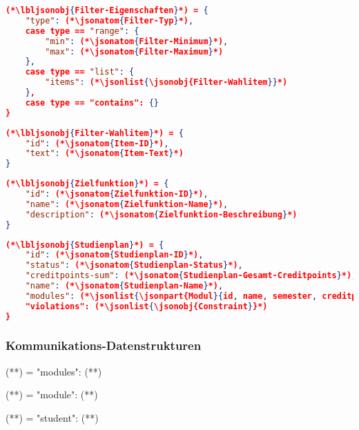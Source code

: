 \begin{lstlisting}[language=json]
(*\lbljsonobj{Filter-Eigenschaften}*) = {
	"type": (*\jsonatom{Filter-Typ}*),
	case type == "range": {
		"min": (*\jsonatom{Filter-Minimum}*),
		"max": (*\jsonatom{Filter-Maximum}*)
	},
	case type == "list": {
		"items": (*\jsonlist{\jsonobj{Filter-Wahlitem}}*)
	},
	case type == "contains": {}
}
\end{lstlisting}

\begin{lstlisting}[language=json]
(*\lbljsonobj{Filter-Wahlitem}*) = {
	"id": (*\jsonatom{Item-ID}*),
	"text": (*\jsonatom{Item-Text}*)
}
\end{lstlisting}

\begin{lstlisting}[language=json]
(*\lbljsonobj{Zielfunktion}*) = {
	"id": (*\jsonatom{Zielfunktion-ID}*),
	"name": (*\jsonatom{Zielfunktion-Name}*),
	"description": (*\jsonatom{Zielfunktion-Beschreibung}*)
}
\end{lstlisting}

\begin{lstlisting}[language=json]
(*\lbljsonobj{Studienplan}*) = {
    "id": (*\jsonatom{Studienplan-ID}*),
    "status": (*\jsonatom{Studienplan-Status}*),
    "creditpoints-sum": (*\jsonatom{Studienplan-Gesamt-Creditpoints}*),
    "name": (*\jsonatom{Studienplan-Name}*),
    "modules": (*\jsonlist{\jsonpart{Modul}{id, name, semester, creditpoints, lecturer}}*),
    "violations": (*\jsonlist{\jsonobj{Constraint}}*)	
}
\end{lstlisting}

\subsubsection*{Kommunikations-Datenstrukturen}

\begin{json}
(**) = {
	"modules": (**)
}	
\end{json}

\begin{json}
(**) = {
	"module": (**)
}	
\end{json}

\begin{json}
(**) = {
	"student": (**)
}	
\end{json}

